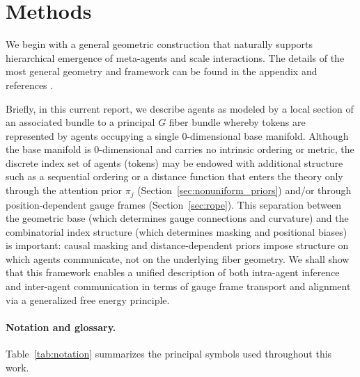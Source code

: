\documentclass[twoside,11pt]{article}
\begin{document}
\section{Methods}

We begin with a general geometric construction that naturally supports hierarchical emergence of meta-agents and scale interactions. The details of the most general geometry and framework can be found in the appendix and references \citep{nakahara2003geometry,kullback1951information,sternberg1994group,fulton1991representation,frankel2011geometry,baez1994gauge}.

Briefly, in this current report, we describe agents as modeled by a local section of an associated bundle to a principal $G$ fiber bundle whereby tokens are represented by agents occupying a single 0-dimensional base manifold. Although the base manifold is 0-dimensional and carries no intrinsic ordering or metric, the discrete index set of agents (tokens) may be endowed with additional structure such as a sequential ordering or a distance function that enters the theory only through the attention prior $\pi_j$ (Section~\ref{sec:nonuniform_priors}) and/or through position-dependent gauge frames (Section~\ref{sec:rope}). This separation between the geometric base (which determines gauge connections and curvature) and the combinatorial index structure (which determines masking and positional biases) is important: causal masking and distance-dependent priors impose structure on which agents communicate, not on the underlying fiber geometry. We shall show that this framework enables a unified description of both intra-agent inference and inter-agent communication in terms of gauge frame transport and alignment via a generalized free energy principle.

\paragraph{Notation and glossary.} Table~\ref{tab:notation} summarizes the principal symbols used throughout this work.
\end{document}

